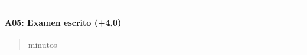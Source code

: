 \documentclass[letterpaper,10pt,spanish]{sphinxmanual}
\begin{document}
\bigskip\hrule\bigskip



\paragraph{A05: Examen escrito (+4,0)}
\label{\detokenize{cursos/ofimatica10/periodo01/G03:a05-examen-escrito-4-0}}
\sphinxAtStartPar
{}
\begin{quote}\begin{description}
 minutos


\end{description}\end{quote}
\end{document}
